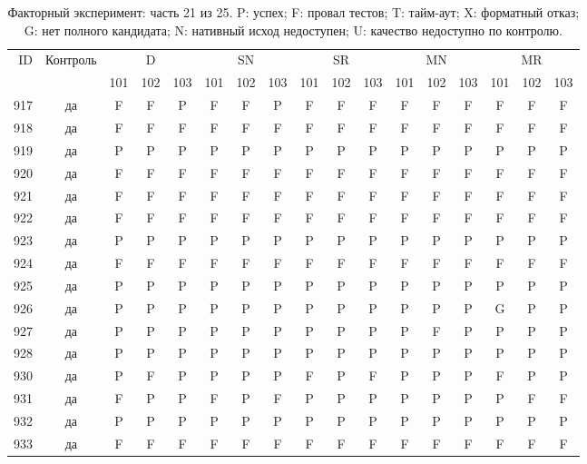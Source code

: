 \begin{table}[p]\centering\footnotesize
\setlength{\tabcolsep}{3pt}
\caption{Факторный эксперимент: часть 21 из 25. P: успех; F: провал тестов; T: тайм-аут; X: форматный отказ; G: нет полного кандидата; N: нативный исход недоступен; U: качество недоступно по контролю.}
\begin{tabular*}{\textwidth}{@{\extracolsep{\fill}}rcccccccccccccccc}\toprule
ID & Контроль & \multicolumn{3}{c}{D} & \multicolumn{3}{c}{SN} & \multicolumn{3}{c}{SR} & \multicolumn{3}{c}{MN} & \multicolumn{3}{c}{MR}\\
\cmidrule(lr){3-5}\cmidrule(lr){6-8}\cmidrule(lr){9-11}\cmidrule(lr){12-14}\cmidrule(lr){15-17}
 & & 101 & 102 & 103 & 101 & 102 & 103 & 101 & 102 & 103 & 101 & 102 & 103 & 101 & 102 & 103\\\midrule
917 & да & F & F & P & F & F & P & F & F & F & F & F & F & F & F & F\\
918 & да & F & F & F & F & F & F & F & F & F & F & F & F & F & F & F\\
919 & да & P & P & P & P & P & P & P & P & P & P & P & P & P & P & P\\
920 & да & F & F & F & F & F & F & F & F & F & F & F & F & F & F & F\\
921 & да & F & F & F & F & F & F & F & F & F & F & F & F & F & F & F\\
922 & да & F & F & F & F & F & F & F & F & F & F & F & F & F & F & F\\
923 & да & P & P & P & P & P & P & P & P & P & P & P & P & P & P & P\\
924 & да & F & F & F & F & F & F & F & F & F & F & F & F & F & F & F\\
925 & да & P & P & P & P & P & P & P & P & P & P & P & P & P & P & P\\
926 & да & P & P & P & P & P & P & P & P & P & P & P & P & G & P & P\\
927 & да & P & P & P & P & P & P & P & P & P & P & F & P & P & P & P\\
928 & да & P & P & P & P & P & P & P & P & P & P & P & P & P & P & P\\
930 & да & P & F & P & P & P & P & F & P & F & P & P & P & F & P & P\\
931 & да & F & P & P & F & P & F & P & P & P & P & P & P & P & F & F\\
932 & да & P & P & P & P & P & P & P & P & P & P & P & P & P & P & P\\
933 & да & F & F & F & F & F & F & F & F & F & F & F & F & F & F & F\\

\end{tabular*}
\end{table}
